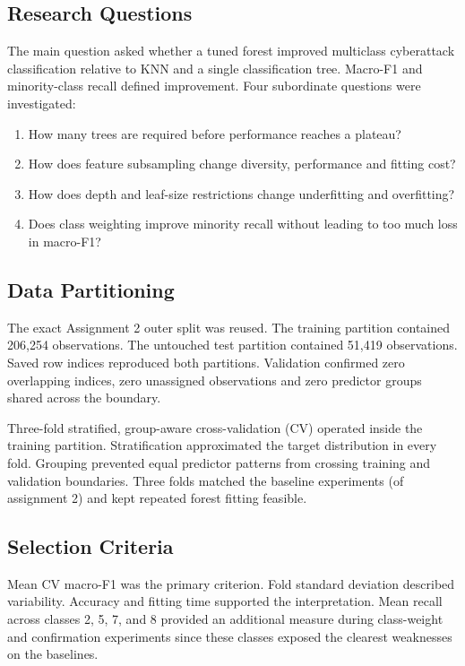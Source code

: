 \documentclass[conference]{IEEEtran}
\begin{document}
\subsection{Research Questions}

The main question asked whether a tuned forest improved multiclass cyberattack classification relative to KNN and a single classification tree. Macro-F1 and minority-class recall defined improvement. Four subordinate questions were investigated:
\begin{enumerate}
\item How many trees are required before performance reaches a plateau?
\item How does feature subsampling change diversity, performance and fitting cost?
\item How does depth and leaf-size restrictions change underfitting and overfitting?
\item Does class weighting improve minority recall without leading to too much loss in macro-F1?
\end{enumerate}

\subsection{Data Partitioning}

The exact Assignment 2 outer split was reused. The training partition contained 206,254 observations. The untouched test partition contained 51,419 observations. Saved row indices reproduced both partitions. Validation confirmed zero overlapping indices, zero unassigned observations and zero predictor groups shared across the boundary.

Three-fold stratified, group-aware cross-validation (CV) operated inside the training partition. Stratification approximated the target distribution in every fold. Grouping prevented equal predictor patterns from crossing training and validation boundaries. Three folds matched the baseline experiments (of assignment 2) and kept repeated forest fitting feasible.

\subsection{Selection Criteria}

Mean CV macro-F1 was the primary criterion. Fold standard deviation described variability. Accuracy and fitting time supported the interpretation. Mean recall across classes 2, 5, 7, and 8 provided an additional  measure during class-weight and confirmation experiments since these classes exposed the clearest  weaknesses on the baselines.
\end{document}
